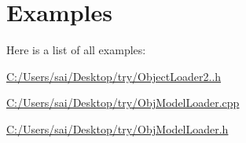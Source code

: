 \section{Examples}
Here is a list of all examples\+:\begin{DoxyCompactItemize}
\item 
\mbox{\hyperlink{_c_1_2_users_2sai_2_desktop_2try_2_object_loader2_88_8h-example}{C\+:/\+Users/sai/\+Desktop/try/\+Object\+Loader2..\+h}}
\item 
\mbox{\hyperlink{_c_1_2_users_2sai_2_desktop_2try_2_obj_model_loader_8cpp-example}{C\+:/\+Users/sai/\+Desktop/try/\+Obj\+Model\+Loader.\+cpp}}
\item 
\mbox{\hyperlink{_c_1_2_users_2sai_2_desktop_2try_2_obj_model_loader_8h-example}{C\+:/\+Users/sai/\+Desktop/try/\+Obj\+Model\+Loader.\+h}}
\end{DoxyCompactItemize}
